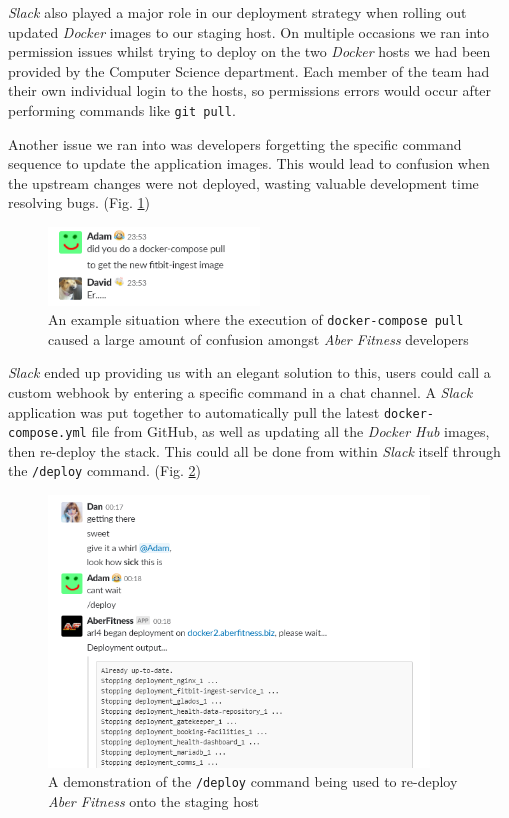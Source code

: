 \par
\textit{Slack} also played a major role in our deployment strategy when rolling out updated \textit{Docker} images to our staging host. On multiple occasions we ran into permission issues whilst trying to deploy on the two \textit{Docker} hosts we had been provided by the Computer Science department. Each member of the team had their own individual login to the hosts, so permissions errors would occur after performing commands like \lstinline{git pull}. 

\par
Another issue we ran into was developers forgetting the specific command sequence to update the application images. This would lead to confusion when the upstream changes were not deployed, wasting valuable development time resolving bugs. (Fig. \ref{fig:david_being_a_dumbass})

\begin{figure}[H]
    \centering
    \includegraphics[width=0.5\textwidth]{Images/aberfitness_slack_bot_reason_why.png}
    \caption{An example situation where the execution of \lstinline{docker-compose pull} caused a large amount of confusion amongst \textit{Aber Fitness} developers}
    \label{fig:david_being_a_dumbass}
\end{figure}

\par
\textit{Slack} ended up providing us with an elegant solution to this, users could call a custom webhook by entering a specific command in a chat channel. A \textit{Slack} application was put together to automatically pull the latest \lstinline{docker-compose.yml} file from GitHub, as well as updating all the \textit{Docker Hub} images, then re-deploy the stack. This could all be done from within \textit{Slack} itself through the \lstinline{/deploy} command. (Fig. \ref{fig:slack_bot})

\begin{figure}[H]
    \centering
    \includegraphics[width=0.9\textwidth]{Images/aberfitness_slack_bot.png}
    \caption{A demonstration of the \lstinline{/deploy} command being used to re-deploy \textit{Aber Fitness} onto the staging host}
    \label{fig:slack_bot}
\end{figure}

